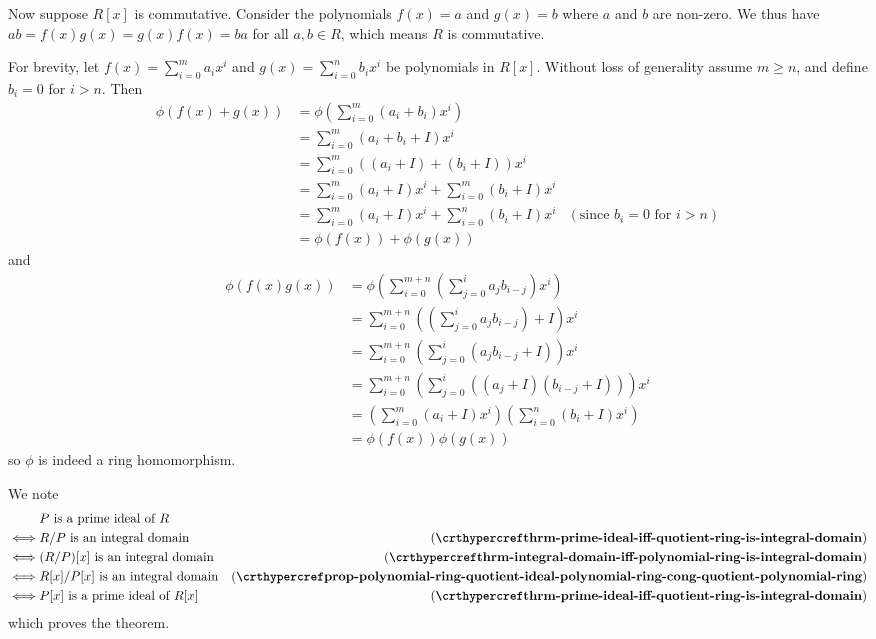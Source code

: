 \begin{questions}
\begin{partquestions}{\alph*}
        Now suppose $R[x]$ is commutative. Consider the polynomials $f(x) = a$ and $g(x) = b$ where $a$ and $b$ are non-zero. We thus have $ab = f(x)g(x) = g(x)f(x) = ba$ for all $a,b \in R$, which means $R$ is commutative.
    \end{partquestions}

    \item For brevity, let $\displaystyle f(x) = \sum_{i=0}^ma_ix^i$ and $\displaystyle g(x) = \sum_{i=0}^nb_ix^i$ be polynomials in $R[x]$. Without loss of generality assume $m \geq n$, and define $b_i = 0$ for $i > n$. Then
    \begin{align*}
        \phi(f(x) + g(x)) &= \phi\left(\sum_{i=0}^m (a_i+b_i)x^i\right)\\
        &= \sum_{i=0}^m (a_i+b_i + I)x^i\\
        &= \sum_{i=0}^m ((a_i + I) + (b_i + I))x^i\\
        &= \sum_{i=0}^m (a_i + I)x^i + \sum_{i=0}^m (b_i + I)x^i\\
        &= \sum_{i=0}^m (a_i + I)x^i + \sum_{i=0}^n (b_i + I)x^i & (\text{since } b_i = 0\text{ for } i > n)\\
        &= \phi(f(x)) + \phi(g(x))
    \end{align*}
    and
    \begin{align*}
        \phi(f(x)g(x)) &= \phi\left(\sum_{i=0}^{m+n}\left(\sum_{j=0}^i a_jb_{i-j}\right)x^i\right)\\
        &= \sum_{i=0}^{m+n}\left(\left(\sum_{j=0}^i a_jb_{i-j}\right) + I\right)x^i\\
        &= \sum_{i=0}^{m+n}\left(\sum_{j=0}^i (a_jb_{i-j} + I)\right)x^i\\
        &= \sum_{i=0}^{m+n}\left(\sum_{j=0}^i ((a_j+I)(b_{i-j}+I))\right)x^i\\
        &= \left(\sum_{i=0}^m(a_i+I)x^i\right)\left(\sum_{i=0}^n(b_i+I)x^i\right)\\
        &= \phi(f(x))\phi(g(x))
    \end{align*}
    so $\phi$ is indeed a ring homomorphism.

    \item We note
    \begin{align*}
        &P \text{ is a prime ideal of }R\\
        \iff&R/P \text{ is an integral domain} & (\myref{thrm-prime-ideal-iff-quotient-ring-is-integral-domain})\\
        \iff&(R/P)[x] \text{ is an integral domain} & (\myref{thrm-integral-domain-iff-polynomial-ring-is-integral-domain})\\
        \iff&R[x]/P[x] \text{ is an integral domain} & (\myref{prop-polynomial-ring-quotient-ideal-polynomial-ring-cong-quotient-polynomial-ring})\\
        \iff&P[x]\text{ is a prime ideal of }R[x] & (\myref{thrm-prime-ideal-iff-quotient-ring-is-integral-domain})
    \end{align*}
    which proves the theorem.


\end{questions}

